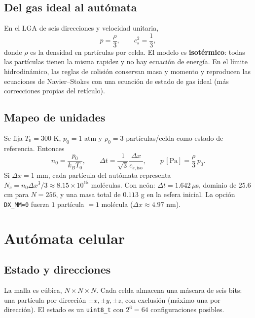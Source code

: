 \documentclass[11pt,a4paper]{article}
\begin{document}
\subsection{Del gas ideal al autómata}

En el LGA de seis direcciones y velocidad unitaria,
\begin{equation}
  p = \frac{\rho}{3}, \qquad c_s^2=\frac{1}{3},
  \label{eq:eos}
\end{equation}
donde $\rho$ es la densidad en partículas por celda. El modelo es
\textbf{isotérmico}: todas las partículas tienen la misma rapidez y no hay
ecuación de energía. En el límite hidrodinámico, las reglas de colisión
conservan masa y momento y reproducen las ecuaciones de Navier--Stokes con una
ecuación de estado de gas ideal (más correcciones propias del retículo).

\subsection{Mapeo de unidades}

Se fija $T_0=300$ K, $p_0=1$ atm y $\rho_0=3$ partículas/celda como estado de
referencia. Entonces
\begin{equation}
  n_0=\frac{p_0}{k_B T_0},\qquad
  \Delta t=\frac{1}{\sqrt{3}}\frac{\Delta x}{c_{s,\text{iso}}},\qquad
  p\,[\text{Pa}]=\frac{\rho}{3}\,p_0 .
  \label{eq:mapping}
\end{equation}
Si $\Delta x=1$ mm, cada partícula del autómata representa
$N_c=n_0\Delta x^3/3\approx 8.15\times10^{15}$ moléculas. Con neón:
$\Delta t=1.642\,\mu$s, dominio de $25.6$ cm para $N=256$, y una masa total de
$0.113$ g en la esfera inicial. La opción \texttt{DX\_MM=0} fuerza
$1$ partícula $=1$ molécula ($\Delta x\approx 4.97$ nm).

\section{Autómata celular}

\subsection{Estado y direcciones}

La malla es cúbica, $N\times N\times N$. Cada celda almacena una máscara de
seis bits: una partícula por dirección $\pm x,\pm y,\pm z$, con exclusión
(máximo una por dirección). El estado es un \texttt{uint8\_t} con $2^6=64$
configuraciones posibles.
\end{document}
